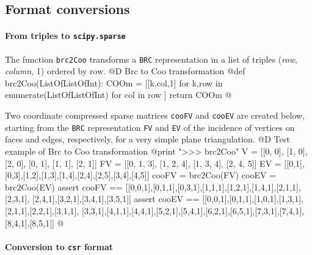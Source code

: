 \documentclass[11pt,oneside]{article}    %
\begin{document}
\subsection{Format conversions}

\paragraph{From triples to \texttt{scipy.sparse}}
The function \texttt{brc2Coo} transforms a \texttt{BRC} representation in a list of triples (\emph{row}, \emph{column}, 1) ordered by row.
@D Brc to Coo transformation
@{def brc2Coo(ListOfListOfInt):
    COOm = [[k,col,1] for k,row in enumerate(ListOfListOfInt)
            for col in row ]
    return COOm
@}

Two coordinate compressed sparse matrices \texttt{cooFV} and \texttt{cooEV} are created below, starting from the \texttt{BRC} representation \texttt{FV} and \texttt{EV} of the incidence of vertices on faces and edges, respectively, for a very simple plane triangulation.
@D Test example of Brc to Coo transformation
@{print "\n>>> brc2Coo"
V = [[0, 0], [1, 0], [2, 0], [0, 1], [1, 1], [2, 1]]
FV = [[0, 1, 3], [1, 2, 4], [1, 3, 4], [2, 4, 5]]
EV = [[0,1],[0,3],[1,2],[1,3],[1,4],[2,4],[2,5],[3,4],[4,5]]
cooFV = brc2Coo(FV)
cooEV = brc2Coo(EV)
assert cooFV == [[0,0,1],[0,1,1],[0,3,1],[1,1,1],[1,2,1],[1,4,1],[2,1,1],
[2,3,1], [2,4,1],[3,2,1],[3,4,1],[3,5,1]]
assert cooEV == [[0,0,1],[0,1,1],[1,0,1],[1,3,1],[2,1,1],[2,2,1],[3,1,1],
[3,3,1],[4,1,1],[4,4,1],[5,2,1],[5,4,1],[6,2,1],[6,5,1],[7,3,1],[7,4,1],
[8,4,1],[8,5,1]]
@}
\paragraph{Conversion to \texttt{csr} format}
\end{document}
